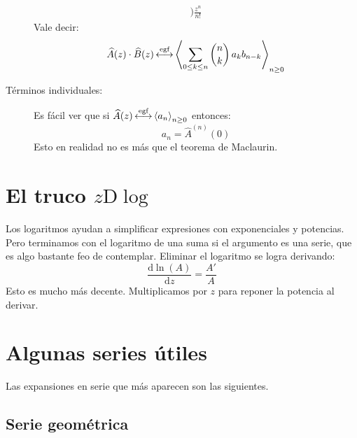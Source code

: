 \begin{description}
\begin{align*}
                          \biggr)
               \frac{z^n}{n!}
    \end{align*}
    Vale decir:
    \begin{equation*}
      \widehat{A}(z) \cdot \widehat{B}(z)
        \operatorname{\stackrel{\text{egf}}{\longleftrightarrow}} \left\langle
               \sum_{0 \le k \le n} \binom{n}{k} \, a_k b_{n - k}
             \right\rangle_{n \ge 0}
    \end{equation*}
  \item[Términos individuales:]
    Es fácil ver que si
    \(\widehat{A}(z)
        \operatorname{\stackrel{\text{egf}}{\longleftrightarrow}} \left\langle a_n \right\rangle_{n \ge 0}\) entonces:
    \begin{equation*}
      a_n = \widehat{A}^{(n)}(0)
    \end{equation*}
    Esto en realidad no es más que el teorema de Maclaurin.%
  \end{description}

\section{\protect\boldmath
           \texorpdfstring{El truco \(z \mathrm{D}\log\)}
                          {Derivada logarítmica}%
       \protect\unboldmath}

  Los logaritmos ayudan a simplificar expresiones con exponenciales
  y potencias.
  Pero terminamos con el logaritmo de una suma
  si el argumento es una serie,
  que es algo bastante feo de contemplar.
  Eliminar el logaritmo se logra derivando:
  \begin{equation*}
    \frac{\mathrm{d} \ln(A)}{\mathrm{d} z} = \frac{A'}{A}
  \end{equation*}
  Esto es mucho más decente.
  Multiplicamos por \(z\)
  para reponer la potencia  al derivar.

\section{Algunas series útiles}
\label{ref:series-utiles}

  Las expansiones en serie que más aparecen son las siguientes.

\subsection{Serie geométrica}
\label{sec:serie-geometrica}

